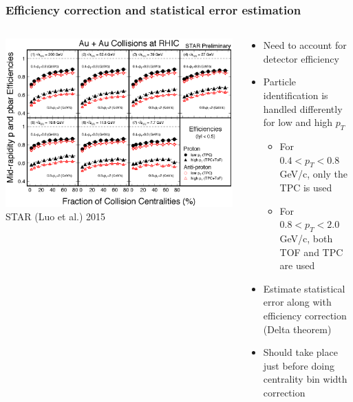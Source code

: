 \documentclass[accentcolor=tud2c,usenames,dvipsnames,colorbacktitle,inverttitle,landscape,german,presentation,t]{tudbeamer}
\begin{document}
  \begin{frame}
    \frametitle{Efficiency correction and statistical error estimation}
    \begin{columns}[c]
      \begin{column}{0.5\textwidth}
        \begin{center}
          \includegraphics[width=1.0\textwidth]{figures/10/peff_BES}
          \\\footnotesize{STAR (Luo et al.) 2015}
        \end{center}
      \end{column}
      \begin{column}{0.5\textwidth}
        \begin{itemize}
          \item Need to account for detector efficiency
          \item Particle identification is handled differently
            for low and high $p_T$
          \begin{itemize}
            \item For $0.4 < p_T < 0.8$ GeV/c, only the TPC is used
            \item For $0.8 < p_T < 2.0$ GeV/c, both TOF and TPC are used
          \end{itemize}
          \item Estimate statistical error along with efficiency correction
            (Delta theorem)
          \item Should take place just before doing centrality bin width
            correction
        \end{itemize}
      \end{column}
    \end{columns}
  \end{frame}
\end{document}
